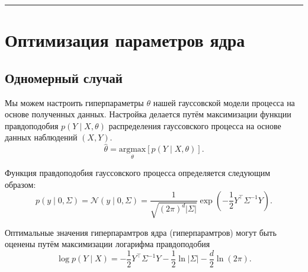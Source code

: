 \documentclass[11pt,a4paper]{article}
\begin{document}
    \begin{center}\rule{0.5\linewidth}{0.5pt}\end{center}

    \hypertarget{ux43eux43fux442ux438ux43cux438ux437ux430ux446ux438ux44f-ux43fux430ux440ux430ux43cux435ux442ux440ux43eux432-ux44fux434ux440ux430}{%
\section{Оптимизация параметров
ядра}\label{ux43eux43fux442ux438ux43cux438ux437ux430ux446ux438ux44f-ux43fux430ux440ux430ux43cux435ux442ux440ux43eux432-ux44fux434ux440ux430}}

    \hypertarget{ux43eux434ux43dux43eux43cux435ux440ux43dux44bux439-ux441ux43bux443ux447ux430ux439}{%
\subsection{Одномерный
случай}\label{ux43eux434ux43dux43eux43cux435ux440ux43dux44bux439-ux441ux43bux443ux447ux430ux439}}

    Мы можем настроить гиперпараметры \(\theta\) нашей гауссовской модели
процесса на основе полученных данных. Настройка делается путём
максимизации функции правдоподобия \(p(Y \mid X, \theta)\) распределения
гауссовского процесса на основе данных наблюдений \((X, Y)\). \[
  \hat{\theta}  = \underset{\theta}{\text{argmax}} \left[ p(Y \mid X, \theta) \right].
\]

    Функция правдоподобия гауссовского процесса определяется следующим
образом: \[
  p(y \mid 0, \Sigma) = \mathcal{N}(y \mid 0, \Sigma) =
  \frac{1}{\sqrt{(2\pi)^d \lvert\Sigma\rvert}} \exp{ \left( -\frac{1}{2}Y^\top \Sigma^{-1} Y \right)}.
\]

    Оптимальные значения гиперпарамтров ядра (гиперпарамтров) могут быть
оценены путём максимизации логарифма правдоподобия \[
  \log p(Y \mid X) = - \frac{1}{2} Y^\top \Sigma^{-1} Y -\frac{1}{2} \ln \lvert \Sigma \rvert - \frac{d}{2} \ln(2\pi). \tag{1}
\]
\end{document}
